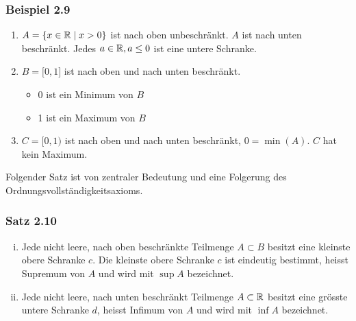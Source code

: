 \subsubsection*{Beispiel 2.9}
\begin{enumerate}
\item $A=\{x\in\mathbb{R}\mid x>0\}$ ist nach oben unbeschränkt. $A$ ist nach unten beschränkt. Jedes $a \in \mathbb{R}, a \leq 0$ ist eine untere Schranke.
\item $B=\lbrack 0,1\rbrack$ ist nach oben und nach unten beschränkt. \begin{itemize}
\item 0 ist ein Minimum von $B$
\item 1 ist ein Maximum von $B$
\end{itemize}
\item $C=\lbrack 0,1)$ ist nach oben und nach unten beschränkt, $0=\min(A)$. $C$ hat kein Maximum.
\end{enumerate}
Folgender Satz ist von zentraler Bedeutung und eine Folgerung des Ordnungsvollständigkeitsaxioms.

\subsubsection*{Satz 2.10}
\begin{enumerate}[i)]
\item Jede nicht leere, nach oben beschränkte Teilmenge $A\subset B$ besitzt eine kleinste obere Schranke $c$. Die kleinste obere Schranke $c$ ist eindeutig bestimmt, heisst Supremum von $A$ und wird mit $\sup A$ bezeichnet.
\item Jede nicht leere, nach unten beschränkt Teilmenge $A\subset\mathbb{R}$ besitzt eine grösste untere Schranke $d$, heisst Infimum von $A$ und wird mit $\inf A$ bezeichnet.
\end{enumerate}
